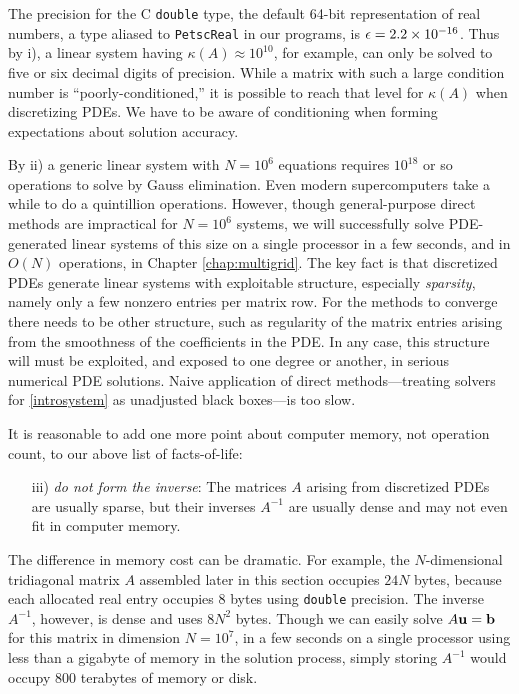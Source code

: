 The precision for the C \texttt{double} type, the default 64-bit representation of real numbers, a type aliased to \texttt{PetscReal} in our \PETSc programs, is $\epsilon = 2.2 \times 10^{-16}$.  Thus by i), a linear system having $\kappa(A) \approx 10^{10}$, for example, can only be solved to five or six decimal digits of precision.  While a matrix with such a large condition number is ``poorly-conditioned,'' it is possible to reach that level for $\kappa(A)$ when discretizing PDEs.  We have to be aware of conditioning when forming expectations about solution accuracy.

By ii) a generic linear system with $N=10^6$ equations requires $10^{18}$ or so operations to solve by Gauss elimination.  Even modern supercomputers take a while to do a quintillion operations.  However, though general-purpose direct methods are impractical for $N=10^6$ systems, we will successfully solve PDE-generated linear systems of this size on a single processor in a few seconds, and in $O(N)$ operations, in Chapter \ref{chap:multigrid}.  The key fact is that discretized PDEs generate linear systems with exploitable structure, especially \emph{sparsity}, namely only a few nonzero entries per matrix row.  For the methods to converge there needs to be other structure, such as regularity of the matrix entries arising from the smoothness of the coefficients in the PDE.  In any case, this structure will must be exploited, and exposed to one degree or another, in serious numerical PDE solutions.  Naive application of direct methods---treating solvers for \eqref{introsystem} as unadjusted black boxes---is too slow.

It is reasonable to add one more point about computer memory, not operation count, to our above list of facts-of-life:
\begin{enumerate}
\item[iii)] \emph{do not form the inverse}:  The matrices $A$ arising from discretized PDEs are usually sparse, but their inverses $A^{-1}$ are usually dense and may not even fit in computer memory.
\end{enumerate}

The difference in memory cost can be dramatic.  For example, the $N$-dimensional tridiagonal matrix $A$ assembled later in this section occupies $24 N$ bytes, because each allocated real entry occupies 8 bytes using \texttt{double} precision.  The inverse $A^{-1}$, however, is dense and uses $8 N^2$ bytes.  Though we can easily solve $A\mathbf{u}=\mathbf{b}$ for this matrix in dimension $N=10^7$, in a few seconds on a single processor using less than a gigabyte of memory in the solution process, simply storing $A^{-1}$ would occupy $800$ terabytes of memory or disk.
\vfill


